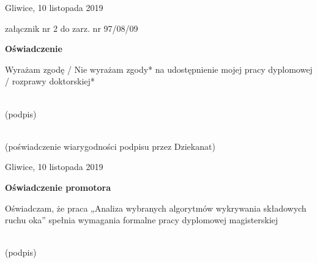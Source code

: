 Gliwice, 10 listopada 2019

\bigskip
\begin{flushright}
    załącznik nr 2 do zarz. nr 97/08/09\\[3\baselineskip]
\end{flushright}
\begin{center}
\begin{Large}
    \textbf{Oświadczenie}\\[3\baselineskip]
\end{Large}
\end{center}
Wyrażam zgodę / Nie wyrażam zgody* na udostępnienie mojej pracy dyplomowej / rozprawy doktorskiej*

\vspace{20mm}
\begin{flushright}
    \makebox[2.5in]{\dotfill}\\
    (podpis)
    \bigskip\bigskip\bigskip

    \makebox[2.5in]{\dotfill}\\
    {(poświadczenie wiarygodności
    podpisu przez Dziekanat)}
\end{flushright}%


\cleardoublepage

Gliwice, 10 listopada 2019

\vspace{20mm}
\begin{center}
\begin{Large}
    \textbf{Oświadczenie promotora}\\[3\baselineskip]
\end{Large}
\end{center}
Oświadczam, że praca „Analiza wybranych algorytmów wykrywania składowych ruchu oka” spełnia wymagania formalne pracy dyplomowej magisterskiej

\bigskip
\bigskip
\begin{flushright}
    \makebox[2.5in]{\dotfill}\\
    (podpis)
\end{flushright}%


\cleardoublepage
